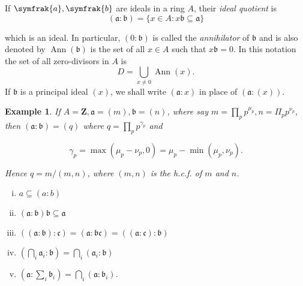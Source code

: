 \documentclass[class=book, crop=false]{standalone}
\newtheorem*{example}{Example}
\theoremstyle{definition}
\theoremstyle{remark}
\begin{document}
If $\symfrak{a}, \symfrak{b}$ are ideals in a ring $A$, their \textit{ideal
  quotient} is
\[
  (\mathfrak{a}: \mathfrak{b})=\{x \in A: x \mathfrak{b} \subseteq \mathfrak{a}\}
\]

which is an ideal. In particular, $(0: \mathfrak{b})$ is called the
\textit{annihilator} of $\mathfrak{b}$ and is also denoted by
$\operatorname{Ann}(\mathfrak{b})$ is the set of all $x \in A$ such that
$x \mathfrak{b}=0$. In this notation the set of all zero-divisors in $A$ is
\[
  D=\bigcup_{x \neq 0} \operatorname{Ann}(x).
\]
If $\mathfrak{b}$ is a principal ideal $(x)$, we shall write $(\mathfrak{a}: x)$
in place of $(\mathfrak{a}:(x))$.
\begin{example}
  If $A=\mathbf{Z}, \mathfrak{a}=(m), \mathfrak{b}=(n)$, where say
  $m=\prod_{p} p^{\mu_{p}}, n=\Pi_{p} p^{\nu_{p}}$, then
  $(\mathfrak{a}: \mathfrak{b})=(q)$ where $q=\prod_{p} p^{\gamma_{p}}$ and

\[
  \gamma_{p}=\max \left(\mu_{p}-\nu_{p}, 0\right)=\mu_{p}-\min \left(\mu_{p}, \nu_{p}\right).
\]

Hence $q=m /(m, n)$, where $(m, n)$ is the h.c.f. of $m$ and $n$.
\end{example}
\begin{exercise}
  \begin{enumerate}[i)]
    \item $a \subseteq(a: b)$
    \item $(\mathfrak{a}: \mathfrak{b}) \mathfrak{b} \subseteq \mathfrak{a}$
    \item
          $((\mathfrak{a}: \mathfrak{b}): \mathfrak{c})=(\mathfrak{a}: \mathfrak{b c})=((\mathfrak{a}: \mathfrak{c}): \mathfrak{b})$
    \item
          $\left(\bigcap_{i} \mathfrak{a}_{i}: \mathfrak{b}\right)=\bigcap_{i}\left(\mathfrak{a}_{i}: \mathfrak{b}\right)$
    \item
          $\left(\mathfrak{a}: \sum_{i} \mathfrak{b}_{i}\right)=\bigcap_{i}\left(\mathfrak{a}: \mathfrak{b}_{i}\right)$.
  \end{enumerate}
\end{exercise}
\end{document}
